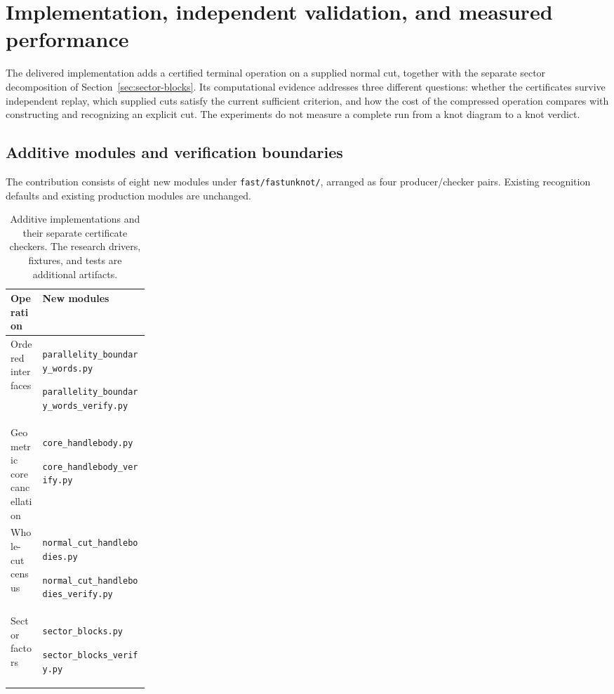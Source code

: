 \section{Implementation, independent validation, and measured performance}
\label{main:experiments}

The delivered implementation adds a certified terminal operation on a supplied
normal cut, together with the separate sector decomposition of
Section~\ref{sec:sector-blocks}.  Its computational evidence addresses three
different questions: whether the certificates survive independent replay,
which supplied cuts satisfy the current sufficient criterion, and how the
cost of the compressed operation compares with constructing and recognizing
an explicit cut.  The experiments do not measure a complete run from a knot
diagram to a knot verdict.

\subsection{Additive modules and verification boundaries}
\label{main:exp-implementation}

The contribution consists of eight new modules under \texttt{fast/fastunknot/},
arranged as four producer/checker pairs.  Existing recognition defaults and
existing production modules are unchanged.

\begin{table}[htbp]
\centering
\small
\begin{tabularx}{\linewidth}{@{}p{0.23\linewidth}Y@{}}
\toprule
Operation & New modules \\
\midrule
Ordered interfaces &
\texttt{parallelity\_boundary\_words.py}\par
\texttt{parallelity\_boundary\_words\_verify.py} \\
Geometric core cancellation &
\texttt{core\_handlebody.py}\par
\texttt{core\_handlebody\_verify.py} \\
Whole-cut census &
\texttt{normal\_cut\_handlebodies.py}\par
\texttt{normal\_cut\_handlebodies\_verify.py} \\
Sector factors &
\texttt{sector\_blocks.py}\par
\texttt{sector\_blocks\_verify.py} \\
\bottomrule
\end{tabularx}
\caption{Additive implementations and their separate certificate checkers.
The research drivers, fixtures, and tests are additional artifacts.}
\label{main:exp-modules}
\end{table}

